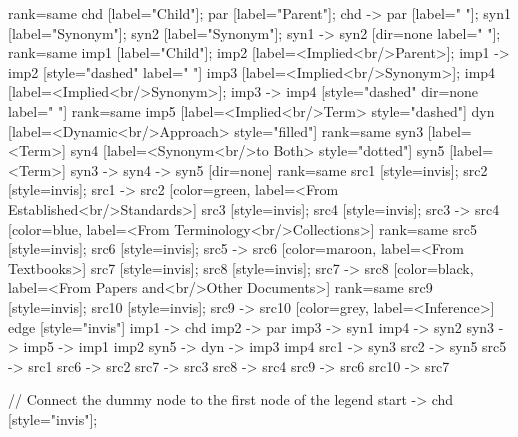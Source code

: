 \documentclass{article}
\begin{document}
{{    {
        rank=same
        chd [label="Child"];
        par [label="Parent"];
        chd -> par [label="                "];
        syn1 [label="Synonym"];
        syn2 [label="Synonym"];
        syn1 -> syn2 [dir=none label="                "];
    }
    {
        rank=same
        imp1 [label="Child"];
        imp2 [label=<Implied<br/>Parent>];
        imp1 -> imp2 [style="dashed" label="                "]
        imp3 [label=<Implied<br/>Synonym>];
        imp4 [label=<Implied<br/>Synonym>];
        imp3 -> imp4 [style="dashed" dir=none label="                "]
    }
    {
        rank=same
        imp5 [label=<Implied<br/>Term> style="dashed"]
        dyn [label=<Dynamic<br/>Approach> style="filled"]
    }
    {
        rank=same
        syn3 [label=<Term>]
        syn4 [label=<Synonym<br/>to Both> style="dotted"]
        syn5 [label=<Term>]
        syn3 -> syn4 -> syn5 [dir=none]
    }
{
rank=same
src1 [style=invis];
src2 [style=invis];
src1 -> src2 [color=green, label=<From Established<br/>Standards>]
src3 [style=invis];
src4 [style=invis];
src3 -> src4 [color=blue, label=<From Terminology<br/>Collections>]
}
{
rank=same
src5 [style=invis];
src6 [style=invis];
src5 -> src6 [color=maroon, label=<From Textbooks>]
src7 [style=invis];
src8 [style=invis];
src7 -> src8 [color=black, label=<From Papers and<br/>Other Documents>]
}
{
rank=same
src9 [style=invis];
src10 [style=invis];
src9 -> src10 [color=grey, label=<Inference>]
}
edge [style="invis"]
imp1 -> chd
imp2 -> par
imp3 -> syn1
imp4 -> syn2
syn3 -> imp5 -> { imp1 imp2 }
syn5 -> dyn -> { imp3 imp4 }
src1 -> syn3
src2 -> syn5
src5 -> src1
src6 -> src2
src7 -> src3
src8 -> src4
src9 -> src6
src10 -> src7
}

// Connect the dummy node to the first node of the legend
start -> chd [style="invis"];
}
\end{document}
